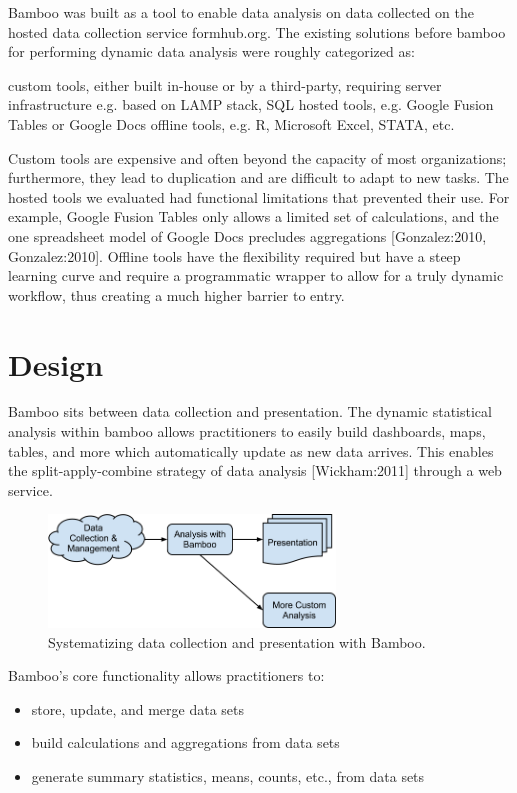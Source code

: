 \documentclass{acm_proc_article-sp}
\begin{document}
Bamboo was built as a tool to enable data analysis on data collected on the hosted data collection service formhub.org. The existing solutions before bamboo for performing dynamic data analysis were roughly categorized as:

custom tools, either built in-house or by a third-party, requiring server infrastructure e.g. based on LAMP stack, SQL
hosted tools, e.g. Google Fusion Tables or Google Docs
offline tools, e.g. R, Microsoft Excel, STATA, etc.

Custom tools are expensive and often beyond the capacity of most organizations; furthermore, they lead to duplication and are difficult to adapt to new tasks.  The hosted tools we evaluated had functional limitations that prevented their use.  For example, Google Fusion Tables only allows a limited set of calculations, and the one spreadsheet model of Google Docs precludes aggregations [Gonzalez:2010, Gonzalez:2010].  Offline tools have the flexibility required but have a steep learning curve and require a programmatic wrapper to allow for a truly dynamic workflow, thus creating a much higher barrier to entry.

\section{Design}
Bamboo sits between data collection and presentation. The dynamic statistical analysis within bamboo allows practitioners to easily build dashboards, maps, tables, and more which automatically update as new data arrives.  This enables the split-apply-combine strategy of data analysis [Wickham:2011] through a web service.

\begin{figure}
\centering
\includegraphics[width=3in]{figures/bamboo_flow}
\caption{Systematizing data collection and presentation with Bamboo.}
\end{figure}

Bamboo’s core functionality allows practitioners to:

\begin{itemize}
\item store, update, and merge data sets
\item build calculations and aggregations from data sets
\item generate summary statistics, means, counts, etc., from data sets
\end{itemize}
\end{document}
